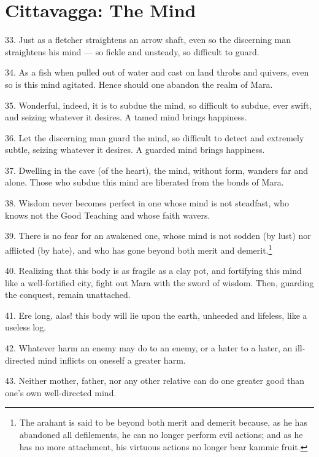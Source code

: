 \chapter{Cittavagga: The Mind}
33. Just as a fletcher straightens an arrow shaft, even so the discerning man straightens his mind — so fickle and unsteady, so difficult to guard.

34. As a fish when pulled out of water and cast on land throbs and quivers, even so is this mind agitated. Hence should one abandon the realm of \Gls{Mara}.

35. Wonderful, indeed, it is to subdue the mind, so difficult to subdue, ever swift, and seizing whatever it desires. A tamed mind brings happiness.

36. Let the discerning man guard the mind, so difficult to detect and extremely subtle, seizing whatever it desires. A guarded mind brings happiness.

37. Dwelling in the cave (of the heart), the mind, without form, wanders far and alone. Those who subdue this mind are liberated from the bonds of \Gls{Mara}.

38. Wisdom never becomes perfect in one whose mind is not steadfast, who knows not the Good Teaching and whose faith wavers.

39. There is no fear for an awakened one, whose mind is not sodden (by lust) nor afflicted (by hate), and who has gone beyond both merit and demerit.\footnote{The arahant is said to be beyond both merit and demerit because, as he has abandoned all defilements, he can no longer perform evil actions; and as he has no more attachment, his virtuous actions no longer bear kammic fruit.}

40. Realizing that this body is as fragile as a clay pot, and fortifying this mind like a well-fortified city, fight out \Gls{Mara} with the sword of wisdom. Then, guarding the conquest, remain unattached.

41. Ere long, alas! this body will lie upon the earth, unheeded and lifeless, like a useless log.

42. Whatever harm an enemy may do to an enemy, or a hater to a hater, an ill-directed mind inflicts on oneself a greater harm.

43. Neither mother, father, nor any other relative can do one greater good than one's own well-directed mind.
